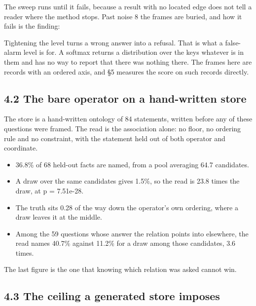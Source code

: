 \documentclass[10pt,letterpaper,twocolumn]{article}
\providecommand{\tightlist}{\setlength{\itemsep}{0pt}\setlength{\parskip}{0pt}}
\begin{document}
The sweep runs until it fails, because a result with no located edge does not tell a reader where
the method stops. Past noise 8 the frames are buried, and how it fails is the finding:


Tightening the level turns a wrong answer into a refusal. That is what a false-alarm level is for. A
softmax returns a distribution over the keys whatever is in them and has no way to report that there
was nothing there. The frames here are records with an ordered axis, and §5 measures the score on
such records directly.

\subsection{4.2 The bare operator on a hand-written store}\label{42-the-bare-operator-on-a-hand-written-store}

The store is a hand-written ontology of 84 statements, written before any of these questions were
framed. The read is the association alone: no floor, no ordering rule and no constraint, with the
statement held out of both operator and coordinate.

\begin{itemize}
\tightlist
\item
  36.8\% of 68 held-out facts are named, from a pool averaging 64.7 candidates.
\item
  A draw over the same candidates gives 1.5\%, so the read is 23.8 times the draw, at p = 7.51e-28.
\item
  The truth sits 0.28 of the way down the operator's own ordering, where a draw leaves it at the middle.
\item
  Among the 59 questions whose answer the relation points into elsewhere, the read names 40.7\% against 11.2\% for a draw among those candidates, 3.6 times.
\end{itemize}

The last figure is the one that knowing which relation was asked cannot win.

\subsection{4.3 The ceiling a generated store imposes}\label{43-the-ceiling-a-generated-store-imposes}
\end{document}
